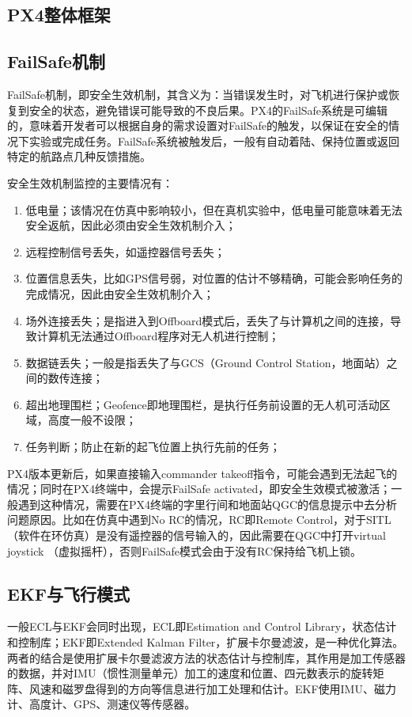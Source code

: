\subsection{PX4整体框架}


\subsection{FailSafe机制} \label{2.2.1}
FailSafe机制，即安全生效机制，其含义为：当错误发生时，对飞机进行保护或恢复到安全的状态，避免错误可能导致的不良后果。PX4的FailSafe系统是可编辑的，意味着开发者可以根据自身的需求设置对FailSafe的触发，以保证在安全的情况下实验或完成任务。FailSafe系统被触发后，一般有自动着陆、保持位置或返回特定的航路点几种反馈措施。

安全生效机制监控的主要情况有：
\begin{enumerate}
	\item 低电量；该情况在仿真中影响较小，但在真机实验中，低电量可能意味着无法安全返航，因此必须由安全生效机制介入；
	\item 远程控制信号丢失，如遥控器信号丢失；
	\item 位置信息丢失，比如GPS信号弱，对位置的估计不够精确，可能会影响任务的完成情况，因此由安全生效机制介入；
	\item 场外连接丢失；是指进入到Offboard模式后，丢失了与计算机之间的连接，导致计算机无法通过Offboard程序对无人机进行控制；
	\item 数据链丢失；一般是指丢失了与GCS（Ground Control Station，地面站）之间的数传连接；
	\item 超出地理围栏；Geofence即地理围栏，是执行任务前设置的无人机可活动区域，高度一般不设限；
	\item 任务判断；防止在新的起飞位置上执行先前的任务；
\end{enumerate}

PX4版本更新后，如果直接输入commander takeoff指令，可能会遇到无法起飞的情况；同时在PX4终端中，会提示FailSafe activated，即安全生效模式被激活；一般遇到这种情况，需要在PX4终端的字里行间和地面站QGC的信息提示中去分析问题原因。比如在仿真中遇到No RC的情况，RC即Remote Control，对于SITL（软件在环仿真）是没有遥控器的信号输入的，因此需要在QGC中打开virtual joystick （虚拟摇杆），否则FailSafe模式会由于没有RC保持给飞机上锁。

\subsection{EKF与飞行模式} \label{2.2.2}

一般ECL与EKF会同时出现，ECL即Estimation and Control Library，状态估计和控制库；EKF即Extended Kalman Filter，扩展卡尔曼滤波，是一种优化算法。两者的结合是使用扩展卡尔曼滤波方法的状态估计与控制库，其作用是加工传感器的数据，并对IMU（惯性测量单元）加工的速度和位置、四元数表示的旋转矩阵、风速和磁罗盘得到的方向等信息进行加工处理和估计。EKF使用IMU、磁力计、高度计、GPS、测速仪等传感器。


